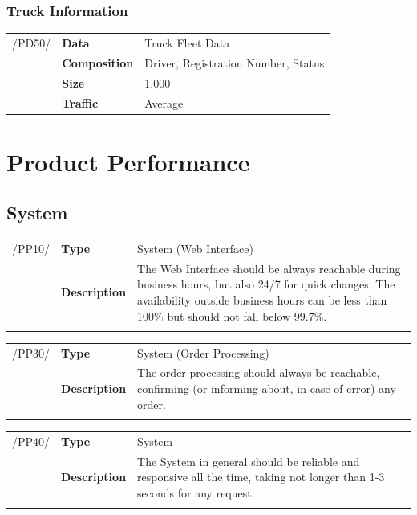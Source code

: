 \documentclass[11pt,a4paper,oneside,svgnames]{report}
\begin{document}
\subsection{Truck Information}
\begin{tabular}{llp{8.75cm}}
\cellcolor{white}/PD50/	& \textbf{Data}			& Truck Fleet Data\\
\cellcolor{white}		& \textbf{Composition}	& Driver, Registration Number, Status\\
\cellcolor{white}		& \textbf{Size}		& 1,000\\
\cellcolor{white}		& \textbf{Traffic}		& Average\\
\end{tabular} 

\chapter{Product Performance}
\section{System}
\noindent
\begin{tabular}{llp{8.75cm}}
\cellcolor{white}/PP10/	& \textbf{Type}			& System (Web Interface)\\
\cellcolor{white}		& \textbf{Description}	& The Web Interface should be always reachable during business hours, but also 24/7 for quick changes. The availability outside business hours can be less than 100\% but should not fall below 99.7\%.\\
\cellcolor{white}		\hfill \\
\end{tabular}

\noindent
\begin{tabular}{llp{8.75cm}}
\cellcolor{white}/PP30/	& \textbf{Type}			& System (Order Processing)\\
\cellcolor{white}		& \textbf{Description}	& The order processing should always be reachable, confirming (or informing about, in case of error) any order.\\
\cellcolor{white}		\hfill \\
\end{tabular}

\noindent
\begin{tabular}{llp{8.75cm}}
\cellcolor{white}/PP40/	& \textbf{Type}			& System\\
\cellcolor{white}		& \textbf{Description}	& The System in general should be reliable and responsive all the time, taking not longer than 1-3 seconds for any request.\\
\cellcolor{white}		\hfill \\
\end{tabular}
\end{document}
